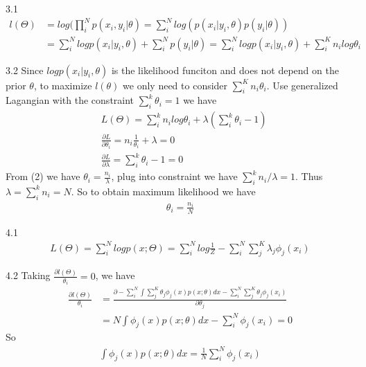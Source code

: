 \documentclass[12pt]{article}
\newenvironment{problem}[2][Problem]{\begin{trivlist}
\item[\hskip \labelsep {\bfseries #1}\hskip \labelsep {\bfseries #2}]}{\end{trivlist}}
\begin{document}
\begin{problem}{Problem 3}
\item{3.1}
\begin{align*}
	l(\Theta) &= log(\prod_i^N p(x_i, y_i|\theta)  = \sum_i^N log(p(x_i|y_i, \theta) p(y_i|\theta))\\
	&= \sum_i^N logp(x_i|y_i,\theta) + \sum_i^N p(y_i|\theta)
	 = \sum_i^N logp(x_i|y_i,\theta) + \sum_i^K n_i log\theta_i
\end{align*}
\item{3.2}
Since $logp(x_i|y_i,\theta)$ is the likelihood funciton and does not depend on the prior $\theta$, to maximize $l(\theta)$ we only need to consider $\sum_i^K n_i \theta_i$. Use generalized Lagangian with the constraint $\sum_i^k\theta_i = 1$ we have 
\begin{align}
	&L(\Theta) = \sum_i^kn_ilog\theta_i + \lambda (\sum_i^k\theta_i - 1) \\
	&\frac{\partial L}{\partial \theta_i} = n_i \frac{1}{\theta_i} + \lambda = 0\\
	&\frac{\partial L}{\partial \lambda} = \sum_i^k\theta_i - 1 = 0
\end{align}
From (2) we have $\theta_i = \frac{n_i}{\lambda}$, plug into constraint we have $\sum_i^k n_i/\lambda = 1$. Thus $\lambda = \sum_i^kn_i = N$. So to obtain maximum likelihood we have
\begin{align*}
	\theta_i = \frac{n_i}{N}
\end{align*}
\end{problem}

\begin{problem}{Problem 4}
\item{4.1}
\begin{align*}
	L(\Theta) = \sum_i^Nlogp(x;\Theta) = \sum_i^Nlog\frac{1}{Z} - \sum_i^N\sum_j^K\lambda_j\phi_j(x_i) 
\end{align*}
\item{4.2}
Taking $\frac{\partial l(\Theta)}{\theta_i} = 0$, we have
\begin{align*}
	\frac{\partial l(\Theta)}{\theta_i} &= \frac{\partial -\sum_i^N \int \sum_j^K \theta_j\phi_j(x) p(x;\theta) dx - \sum_i^N\sum_j^K\theta_j\phi_j(x_i)}{\partial \theta_j}\\
	&= N \int \phi_j(x) p(x;\theta) dx - \sum_i^N\phi_j(x_i) = 0
\end{align*}
So
\begin{align*}
	\int \phi_j(x) p(x;\theta) dx = \frac{1}{N} \sum_i^N\phi_j(x_i)
\end{align*}
\end{problem}

 
\end{document}
